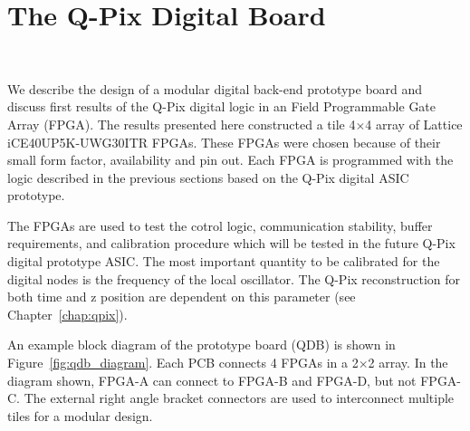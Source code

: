 \section{The Q-Pix Digital Board}~\label{sec:qdb_prototype}

We describe the design of a modular digital back-end prototype board and discuss first results of the Q-Pix digital logic in an Field Programmable Gate Array (FPGA).
The results presented here constructed a tile 4$\times$4 array of Lattice iCE40UP5K-UWG30ITR FPGAs.
These FPGAs were chosen because of their small form factor, availability and pin out.
Each FPGA is programmed with the logic described in the previous sections based on the Q-Pix digital ASIC prototype.

The FPGAs are used to test the cotrol logic, communication stability, buffer requirements, and calibration procedure which will be tested in the future Q-Pix digital prototype ASIC.
The most important quantity to be calibrated for the digital nodes is the frequency of the local oscillator.
The Q-Pix reconstruction for both time and z position are dependent on this parameter (see Chapter~\ref{chap:qpix}).

An example block diagram of the prototype board (QDB) is shown in Figure~\ref{fig:qdb_diagram}.
Each PCB connects 4 FPGAs in a 2$\times$2 array.
In the diagram shown, FPGA-A can connect to FPGA-B and FPGA-D, but not FPGA-C.
The external right angle bracket connectors are used to interconnect multiple tiles for a modular design.

